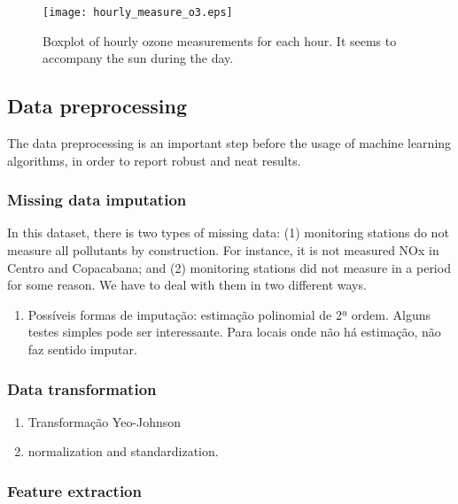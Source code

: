 \begin{figure}[H]
    \begin{center}
        \texttt{[image: hourly\_measure\_o3.eps]}
    \end{center}
    \caption{Boxplot of hourly ozone measurements for each hour. It seems to accompany the sun during the day. }
    \label{fig:hourly-boxplot-ozone}
\end{figure}


\subsection{Data preprocessing}
\label{sec:data-preprocessing}

The data preprocessing is an important step before the usage of machine
learning algorithms, in order to report robust and neat results. 

\subsubsection{Missing data imputation}

In this dataset, there is two types of missing data: (1) monitoring stations
do not measure all pollutants by construction. For instance, it is not
measured NOx in Centro and Copacabana; and (2) monitoring stations did not
measure in a period for some reason. We have to deal with them in two
different ways. 

\begin{enumerate}
    \item Possíveis formas de imputação: estimação polinomial de 2ª ordem.
    Alguns testes simples pode ser interessante. Para locais onde não há
    estimação, não faz sentido imputar. 
\end{enumerate}

\subsubsection{Data transformation}

\begin{enumerate}
    \item Transformação Yeo-Johnson 
    \item normalization and standardization. 
\end{enumerate}

\subsubsection{Feature extraction}

